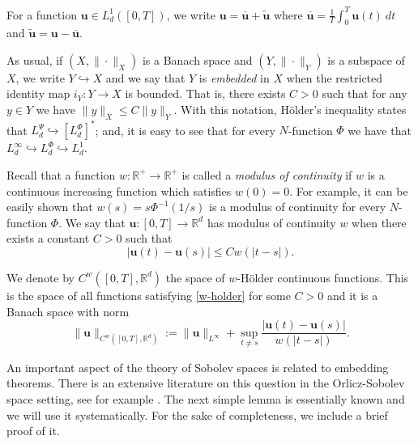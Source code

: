 \documentclass[twoside]{article}
\newcounter{nota_fer_cont}
\theoremstyle{remark}
\newcommand{\lphi}{L^{\Phi}}
\newcommand{\lpsi}{L^{\Psi}}
\renewcommand{\b}[1]{\boldsymbol{#1}}
\newcommand{\rr}{\mathbb{R}}
\renewcommand{\leq}{\leqslant}
\begin{document}
For a  function $\b{u}\in L^1_d([0,T])$, we write $\b{u}=\overline{\b{u}}+\widetilde{\b{u}}$ where $\overline{\b{u}} =\frac1T\int_0^T \b{u}(t)\ dt$ and $\widetilde{\b{u}}=\b{u}-\overline{\b{u}}$.

As usual, if $(X,\|\cdot\|_X)$ is a Banach space and $(Y,\|\cdot \|_Y)$ is a subspace of $X$,  we write $Y\hookrightarrow X$ and we say that $Y$ is \emph{embedded} in $X$  when the restricted identity map $i_Y:Y\to X$ is bounded. That is, there exists $C>0$ such that  for any $y\in Y$ we have $\|y\|_X\leq C\|y\|_Y$.  With this notation, H\"older's inequality states that  $\lpsi_d\hookrightarrow  \left[\lphi_d\right]^*$; and, it is easy to see that for every $N$-function $\Phi$ we have that $L^{\infty}_d\hookrightarrow\lphi_d \hookrightarrow L^1_d$.


 Recall that a function   $w:\mathbb{R}^+\to \mathbb{R}^+$ is called  a \emph{modulus of continuity} if $w$ is a continuous increasing function which satisfies $w(0)=0$. For example, it can be easily shown that $w(s)=s\Phi^{-1}(1/s)$ is a modulus of  continuity for every $N$-function $\Phi$.  We say that $\b{u}:[0,T]\to\rr^d$  has modulus of continuity $w$  when there exists a constant $C>0$ such that 
\begin{equation}\label{w-holder}|\b{u}(t)-\b{u}(s)|\leq Cw(|t-s|).
\end{equation}


We denote by $C^w([0,T],\rr^d)$  the space of  $w$-H\"older continuous functions. This is the space of all functions satisfying \eqref{w-holder} for some $C>0$ and it is a Banach space with norm
\[\|\b{u}\|_{  C^w([0,T],\rr^d) }  :=\|\b{u}\|_{L^{\infty}}+\sup\limits_{t\neq s}\frac{|\b{u}(t)-\b{u}(s)|}{w(|t-s|)}.\]





 An important aspect of the theory of Sobolev spaces is related to embedding theorems. There is an extensive literature on this question in the  Orlicz-Sobolev space setting, see for example
 \cite{cianchi2000fully,cianchi1999some,claverooptimal,edmunds2000optimal,kerman2006optimal}.
The next simple lemma is essentially known and we will use it systematically. For the sake of completeness, we include a brief proof of it.
\end{document}
